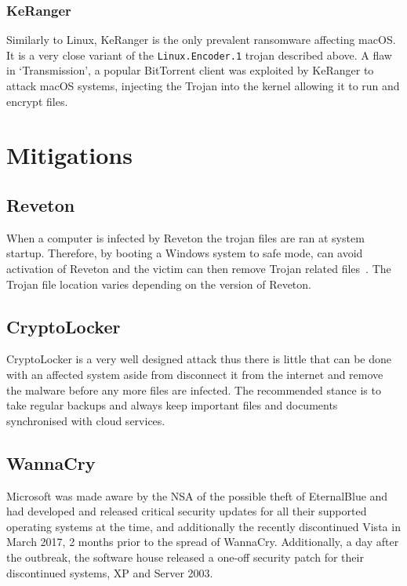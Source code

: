 \documentclass[10pt,a4paper]{article}
\begin{document}
\subsubsection{KeRanger}

Similarly to Linux, KeRanger is the only prevalent ransomware affecting macOS. It is a very close variant of the \texttt{Linux.Encoder.1} trojan described above. A flaw in `Transmission', a popular BitTorrent client was exploited by KeRanger to attack macOS systems, injecting the Trojan into the kernel allowing it to run and encrypt files.

\section{Mitigations} \label{sec:mitigations}

\subsection{Reveton}
When a computer is infected by Reveton the trojan files are ran at system startup. Therefore, by booting a Windows system to safe mode, can avoid activation of Reveton and the victim can then remove Trojan related files~\cite{revetonremoval}. The Trojan file location varies depending on the version of Reveton.

\subsection{CryptoLocker}
CryptoLocker is a very well designed attack thus there is little that can be done with an affected system aside from disconnect it from the internet and remove the malware before any more files are infected. The recommended stance is to take regular backups and always keep important files and documents synchronised with cloud services.

\subsection{WannaCry}

Microsoft was made aware by the NSA of the possible theft of EternalBlue and had developed and released critical security updates for all their supported operating systems at the time, and additionally the recently discontinued Vista in March 2017, 2 months prior to the spread of WannaCry. Additionally, a day after the outbreak, the software house released a one-off security patch for their discontinued systems, XP and Server 2003.
\end{document}
